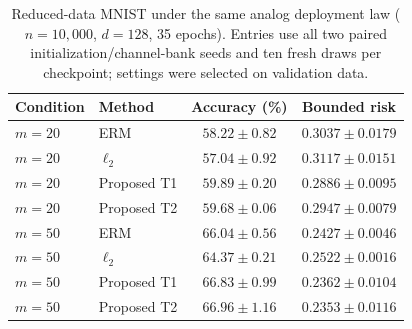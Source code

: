 \begin{table}[!ht]
\centering\footnotesize
\caption{Reduced-data MNIST under the same analog deployment law ($n=10{,}000$, $d=128$, 35 epochs). Entries use all two paired initialization/channel-bank seeds and ten fresh draws per checkpoint; settings were selected on validation data.}
\label{tab:app_reduced_mnist}
\begin{tabular}{llcc}
\toprule
Condition & Method & Accuracy (\%) & Bounded risk\\
\midrule
$m=20$ & ERM & $58.22\pm0.82$ & $0.3037\pm0.0179$\\
$m=20$ & $\ell_2$ & $57.04\pm0.92$ & $0.3117\pm0.0151$\\
$m=20$ & Proposed T1 & $\mathbf{59.89\pm0.20}$ & $\mathbf{0.2886\pm0.0095}$\\
$m=20$ & Proposed T2 & $59.68\pm0.06$ & $0.2947\pm0.0079$\\
\addlinespace
$m=50$ & ERM & $66.04\pm0.56$ & $0.2427\pm0.0046$\\
$m=50$ & $\ell_2$ & $64.37\pm0.21$ & $0.2522\pm0.0016$\\
$m=50$ & Proposed T1 & $66.83\pm0.99$ & $0.2362\pm0.0104$\\
$m=50$ & Proposed T2 & $\mathbf{66.96\pm1.16}$ & $\mathbf{0.2353\pm0.0116}$\\
\bottomrule
\end{tabular}
\end{table}
